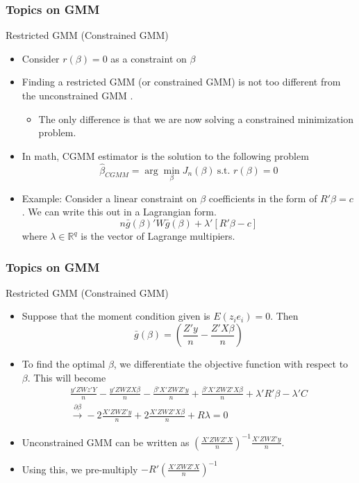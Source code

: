 \documentclass{beamer}
\begin{document}
\begin{frame}
\frametitle{Topics on GMM}
Restricted GMM (Constrained GMM)
\begin{itemize}
\item Consider $r(\beta)=0$ as a constraint on $\beta$
\item Finding a restricted GMM (or constrained GMM) is not too different from the unconstrained GMM .
\begin{itemize}
\item The only difference is that we are now solving a constrained minimization problem. 
\end{itemize}
\item  In math, CGMM estimator is the solution to the following problem
\[
\hat{\beta}_{CGMM}=\arg\min_\beta J_n(\beta) \ \text{s.t. } r(\beta)=0
\]
\item Example: Consider a linear constraint on $\beta$ coefficients in the form of $R'\beta=c$. We can write this out in a Lagrangian form.
\[
n\bar{g}(\beta)'W\bar{g}(\beta) + \lambda' [R'\beta-c]
\]
where $\lambda\in\mathbb{R}^q$ is the vector of Lagrange multipiers.
\end{itemize}
\end{frame}

\begin{frame}
\frametitle{Topics on GMM}
Restricted GMM (Constrained GMM)
\begin{itemize}
\item Suppose that the moment condition given is $E(z_ie_i)=0$. Then 
\[
\bar{g}(\beta)=\left(\frac{Z'y}{n}-\frac{Z'X\beta}{n}\right)
\]
\item To find the optimal $\beta$, we differentiate the objective function with respect to $\beta$. This will become
\small{\begin{gather*}
\frac{y'ZWz'Y}{n}-\frac{y'ZWZX\beta}{n}-\frac{\beta'X'ZWZ'y}{n}+\frac{\beta'X'ZWZ'X\beta}{n}+\lambda'R'\beta-\lambda'C\\
\xrightarrow{\partial\beta} -2\frac{X'ZWZ'y}{n}+2\frac{X'ZWZ'X\beta}{n}+R\lambda =0
\end{gather*}}\normalsize
\item  Unconstrained GMM can be written as \small{$\left(\frac{X'ZWZ'X}{n}\right)^{-1}\frac{X'ZWZ'y}{n}$}\normalsize. 
\item Using this, we  pre-multiply $-R'\left(\frac{X'ZWZ'X}{n}\right)^{-1}$
\end{itemize}
\end{frame}
\end{document}
